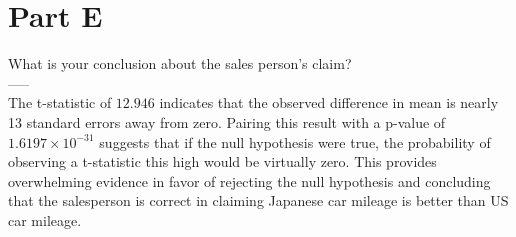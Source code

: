 \section{Part E}
What is your conclusion about the sales person's claim?\\
-----\\

The t-statistic of $ 12.946 $ indicates that the observed difference in mean is nearly 13 standard errors away from zero. Pairing this result with a p-value of $ 1.6197 \times 10^{-31} $ suggests that if the null hypothesis were true, the probability of observing a t-statistic this high would be virtually zero. This provides overwhelming evidence in favor of rejecting the null hypothesis and concluding that the salesperson is correct in claiming Japanese car mileage is better than US car mileage.

\newpage
